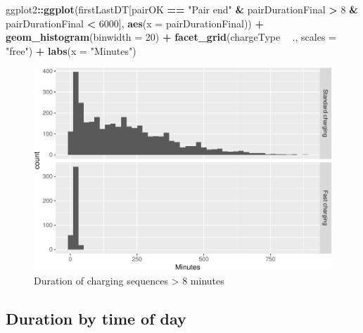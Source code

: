 \documentclass[]{article}
\newenvironment{Shaded}{\begin{snugshade}}{\end{snugshade}}
\newcommand{\KeywordTok}[1]{\textcolor[rgb]{0.13,0.29,0.53}{\textbf{#1}}}
\newcommand{\DataTypeTok}[1]{\textcolor[rgb]{0.13,0.29,0.53}{#1}}
\newcommand{\DecValTok}[1]{\textcolor[rgb]{0.00,0.00,0.81}{#1}}
\newcommand{\StringTok}[1]{\textcolor[rgb]{0.31,0.60,0.02}{#1}}
\newcommand{\OperatorTok}[1]{\textcolor[rgb]{0.81,0.36,0.00}{\textbf{#1}}}
\newcommand{\NormalTok}[1]{#1}
\begin{document}
\begin{Shaded}
\begin{Highlighting}[]
\NormalTok{ggplot2}\OperatorTok{::}\KeywordTok{ggplot}\NormalTok{(firstLastDT[pairOK }\OperatorTok{==}\StringTok{ "Pair end"} \OperatorTok{&}\StringTok{ }\NormalTok{pairDurationFinal }\OperatorTok{>}\StringTok{ }\DecValTok{8} \OperatorTok{&}\StringTok{ }\NormalTok{pairDurationFinal }\OperatorTok{<}\StringTok{ }\DecValTok{6000}\NormalTok{], }
                \KeywordTok{aes}\NormalTok{(}\DataTypeTok{x =}\NormalTok{ pairDurationFinal)) }\OperatorTok{+}
\StringTok{  }\KeywordTok{geom_histogram}\NormalTok{(}\DataTypeTok{binwidth =} \DecValTok{20}\NormalTok{) }\OperatorTok{+}
\StringTok{  }\KeywordTok{facet_grid}\NormalTok{(chargeType }\OperatorTok{~}\StringTok{ }\NormalTok{., }\DataTypeTok{scales =} \StringTok{"free"}\NormalTok{) }\OperatorTok{+}
\StringTok{  }\KeywordTok{labs}\NormalTok{(}\DataTypeTok{x =} \StringTok{"Minutes"}\NormalTok{)}
\end{Highlighting}
\end{Shaded}

\begin{figure}
\centering
\includegraphics{EVBB_SummaryReport_files/figure-latex/longDuration-1.pdf}
\caption{\label{fig:longDuration}Duration of charging sequences
\textgreater{} 8 minutes}
\end{figure}

\subsection{Duration by time of day}\label{duration-by-time-of-day}
\end{document}
